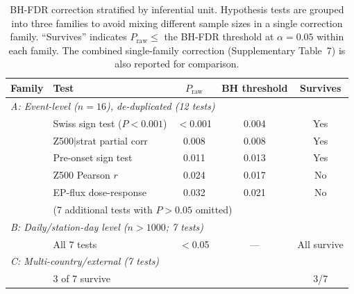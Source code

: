 \documentclass[11pt,letterpaper]{article}
\begin{document}
\begin{table}[htbp]
\caption{BH-FDR correction stratified by inferential unit. Hypothesis tests are grouped into three families to avoid mixing different sample sizes in a single correction family. ``Survives'' indicates $P_{\mathrm{raw}} \leq$ the BH-FDR threshold at $\alpha = 0.05$ within each family. The combined single-family correction (Supplementary Table~7) is also reported for comparison.}
\label{tab:fdr_stratified}
\small
\begin{tabular}{llccc}
\toprule
Family & Test & $P_{\mathrm{raw}}$ & BH threshold & Survives \\
\midrule
\multicolumn{5}{l}{\textit{A: Event-level ($n = 16$), de-duplicated (12 tests)}} \\
 & Swiss sign test ($P < 0.001$) & $<$0.001 & 0.004 & Yes \\
 & Z500$|$strat partial corr & 0.008 & 0.008 & Yes \\
 & Pre-onset sign test & 0.011 & 0.013 & Yes \\
 & Z500 Pearson $r$ & 0.024 & 0.017 & No \\
 & EP-flux dose-response & 0.032 & 0.021 & No \\
 & \multicolumn{4}{l}{\footnotesize (7 additional tests with $P > 0.05$ omitted)} \\
\midrule
\multicolumn{5}{l}{\textit{B: Daily/station-day level ($n > 1000$; 7 tests)}} \\
 & All 7 tests & $<$0.05 & --- & All survive \\
\midrule
\multicolumn{5}{l}{\textit{C: Multi-country/external (7 tests)}} \\
 & 3 of 7 survive & & & 3/7 \\
\bottomrule
\end{tabular}
\end{table}
\end{document}

